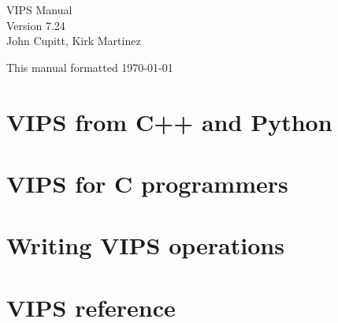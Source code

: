 \documentclass[a4paper,twocolumn,dvips]{book}
\begin{document}

\begin{titlepage}
\thispagestyle{empty}
\begin{center}
\huge
VIPS Manual\\
\large Version 7.24\\
\vspace{0.5in}
\large
John Cupitt,
Kirk Martinez\\
\end{center}

\vspace{6in}

This manual formatted \today
\setcounter{page}{1}
\end{titlepage}

\tableofcontents
\thispagestyle{plain}

\listoffigures
\thispagestyle{plain}

\listoftables
\thispagestyle{plain}

{}
\thispagestyle{plain}
\cfoot{}

\chapter{VIPS from C++ and Python}








\chapter{VIPS for C programmers}








\chapter{Writing VIPS operations}






\chapter{VIPS reference}



\end{document}
